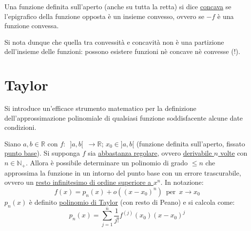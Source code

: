 \documentclass[10pt, oneside]{book}
\theoremstyle{plain}
\begin{document}
\begin{defin}
Una funzione definita sull'aperto (anche su tutta la retta) si dice \underline{concava} se l'epigrafico della funzione opposta è un insieme convesso, ovvero se $-f$ è una funzione convessa.
\end{defin}
\begin{oss}
Si nota dunque che quella tra convessità e concavità non è una partizione dell'insieme delle funzioni: possono esistere funzioni nè concave nè convesse (!).
\end{oss}

\chapter{Taylor}
Si introduce un'efficace strumento matematico per la definizione dell'approssimazione polinomiale di qualsiasi funzione soddisfacente alcune date condizioni.
\begin{ther}
Siano $a, b \in \mathbb{R}$ con $f : \enspace ]a, b[ \enspace \rightarrow \mathbb{R}$; $x_0 \in ]a,b[$ (funzione definita sull'aperto, fissato \underline{punto base}). Si supponga $f$ sia \underline{abbastanza regolare}, ovvero \underline{derivabile $n$ volte} con $n \in \mathbb{N}_+$. Allora è possibile determinare un polinomio di grado $\leq n$ che approssima la funzione in un intorno del punto base con un errore trascurabile, ovvero un \underline{resto infinitesimo di ordine superiore a $x^n$}. In notazione:
\[f(x) = p_n(x) + o ((x - x_0)^n) \enspace \textrm{per} \enspace x \rightarrow x_0\]
$p_n(x)$ è definito \underline{polinomio di Taylor} (con resto di Peano) e si calcola come:
\[p_n(x) = \sum \limits_{j = 1}^n \frac{1}{j!}f^{(j)}(x_0) (x - x_0)^j\]
\end{ther}
\end{document}
